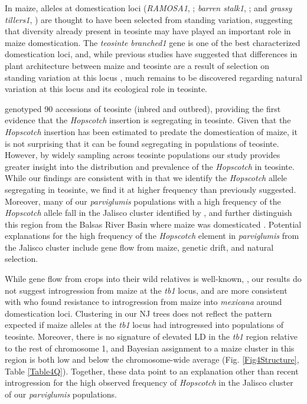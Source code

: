 \documentclass[11pt]{article} %
\begin{document}
\begin{linenumbers}
\begin{flushleft}
In maize, alleles at domestication loci (\emph{RAMOSA1}, \citealt{SigmonVollbrecht2010}; \emph{barren stalk1}, \citealt{Gallavotti2004}; and \emph{grassy tillers1}, \citealt{Whipple2011}) are thought to have been selected from standing variation, suggesting that diversity already present in teosinte may have played an important role in maize domestication. The \emph{teosinte branched1} gene is one of the best characterized domestication loci, and, while previous studies have suggested that differences in plant architecture between maize and teosinte are a result of selection on standing variation at this locus \citep{Clark2006, Studer2011}, much remains to be discovered regarding natural variation at this locus and its ecological role in teosinte.

\citet{Studer2011} genotyped 90 accessions of teosinte (inbred and outbred), providing the first evidence that the \emph{Hopscotch} insertion is segregating in teosinte. 
Given that the \emph{Hopscotch} insertion has been estimated to predate the domestication of maize, it is not surprising that it can be found segregating in populations of teosinte. However, by widely sampling across teosinte populations our study provides greater insight into the distribution and prevalence of the \emph{Hopscotch} in teosinte. While our findings are consistent with \citet{Studer2011} in that we identify the \emph{Hopscotch} allele segregating in teosinte, we find it at higher frequency than previously suggested.
Moreover, many of our \emph{parviglumis} populations with a high frequency of the \emph{Hopscotch} allele fall in the Jalisco cluster identified by \citet{Fukunaga2005}, and further distinguish this region from the Balsas River Basin where maize was domesticated \citep{Matsuoka2002}. Potential explanations for the high frequency of the \emph{Hopscotch} element in \emph{parviglumis} from the Jalisco cluster include gene flow from maize, genetic drift, and natural selection. 

While gene flow from crops into their wild relatives is well-known, \citep{Ellstrand1999, Zhang2009, Thurber2010, Baack2008, Hubner2012, Wilkes1977, VanHeerwaarden2011, Barrett1983}, our results do not suggest introgression from maize at the \emph{tb1} locus, and are more consistent with \citet{Hufford2013} who found resistance to introgression from maize into \emph{mexicana} around domestication loci. 
Clustering in our NJ trees does not reflect the pattern expected if maize alleles at the \emph{tb1} locus had introgressed into populations of teosinte.  Moreover, there is no signature of elevated LD in the \emph{tb1} region relative to the rest of chromosome 1, and Bayesian assignment to a maize cluster in this region is both low and below the chromosome-wide average (Fig. \ref{Fig4Structure}, Table \ref{Table4Q}). Together, these data point to an explanation other than recent introgression for the high observed frequency of \emph{Hopscotch} in the Jalisco cluster of our \emph{parviglumis} populations.


\end{flushleft}
\end{linenumbers}
\end{document}
